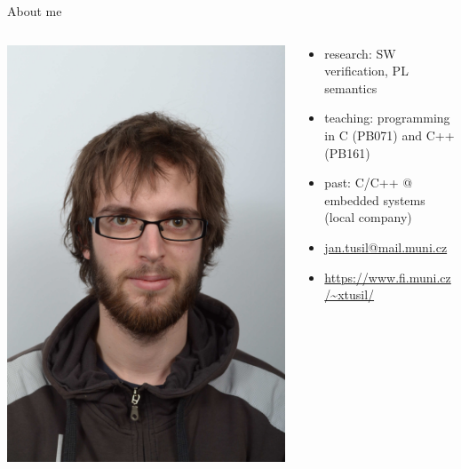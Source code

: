 \documentclass[11pt]{beamer}
\begin{document}
\begin{frame}{About me}
\begin{columns}

\begin{column}{0.30\textwidth}
\includegraphics[width=1.0\linewidth]{img/me.jpg}
\end{column}
\begin{column}{0.7\textwidth}
\begin{itemize}
\pause \item research: SW verification, PL semantics
\pause \item teaching: programming in C (PB071) and C++ (PB161)
\pause \item past: C/C++ @ embedded systems (local company)
\pause \item \url{jan.tusil@mail.muni.cz}
\pause \item \url{https://www.fi.muni.cz/~xtusil/}
\end{itemize}
\end{column}
\end{columns}
\end{frame}
\end{document}
